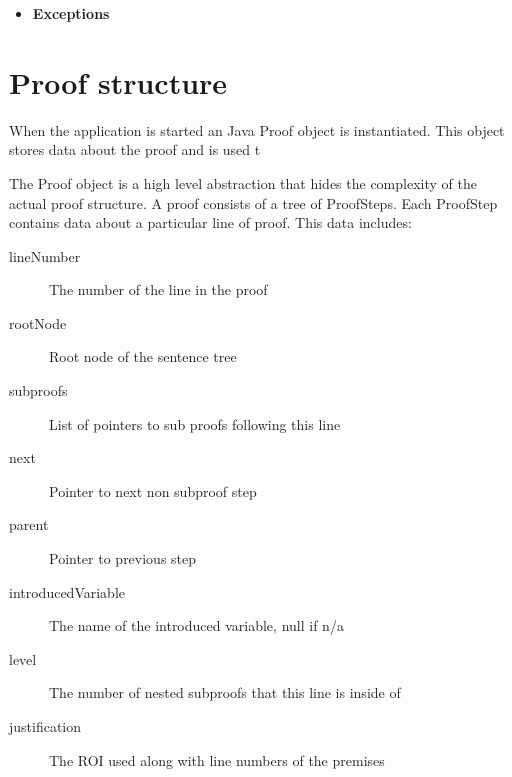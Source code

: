 \begin{itemize}
{\begin{itemize}
{\begin{itemize}
\item{
\sld
{\tt conclusion} - The root node of the sentence being justified}
\end{itemize}
}%
\item{{\bf Exceptions}
}%
\end{itemize}
}%

\end{itemize}





\section{Proof structure}

When the application is started an Java Proof object is instantiated. This object stores data about the proof and is used t

The Proof object is a high level abstraction that hides the complexity of the actual proof structure. A proof consists of a tree of ProofSteps. Each ProofStep contains data about a particular line of proof. This data includes:
\begin {description}
\item[lineNumber] The number of the line in the proof
\item[rootNode] Root node of the sentence tree
\item[subproofs] List of pointers to sub proofs following this line
\item[next] Pointer to next non subproof step
\item[parent] Pointer to previous step
\item[introducedVariable] The name of the introduced variable, null if n/a
\item[level] The number of nested subproofs that this line is inside of
\item[justification] The ROI used along with line numbers of the premises
\end{description}

